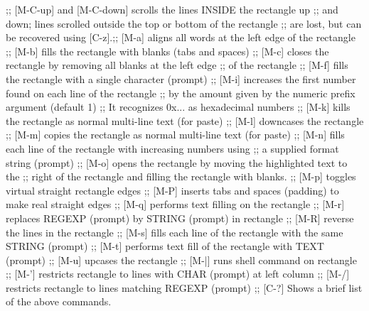 \documentclass[11pt]{article}
\begin{document}
{;; [M-C-up] and [M-C-down] scrolls the lines INSIDE the rectangle up
;; and down; lines scrolled outside the top or bottom of the rectangle
;; are lost, but can be recovered using [C-z].;; [M-a] aligns all words at the left edge of the rectangle
;; [M-b] fills the rectangle with blanks (tabs and spaces)
;; [M-c] closes the rectangle by removing all blanks at the left edge
;;       of the rectangle
;; [M-f] fills the rectangle with a single character (prompt)
;; [M-i] increases the first number found on each line of the rectangle
;;       by the amount given by the numeric prefix argument (default 1)
;;       It recognizes 0x... as hexadecimal numbers
;; [M-k] kills the rectangle as normal multi-line text (for paste)
;; [M-l] downcases the rectangle
;; [M-m] copies the rectangle as normal multi-line text (for paste)
;; [M-n] fills each line of the rectangle with increasing numbers using
;;       a supplied format string (prompt)
;; [M-o] opens the rectangle by moving the highlighted text to the
;;       right of the rectangle and filling the rectangle with blanks.
;; [M-p] toggles virtual straight rectangle edges
;; [M-P] inserts tabs and spaces (padding) to make real straight edges
;; [M-q] performs text filling on the rectangle
;; [M-r] replaces REGEXP (prompt) by STRING (prompt) in rectangle
;; [M-R] reverse the lines in the rectangle
;; [M-s] fills each line of the rectangle with the same STRING (prompt)
;; [M-t] performs text fill of the rectangle with TEXT (prompt)
;; [M-u] upcases the rectangle
;; [M-|] runs shell command on rectangle
;; [M-'] restricts rectangle to lines with CHAR (prompt) at left column
;; [M-/] restricts rectangle to lines matching REGEXP (prompt)
;; [C-?] Shows a brief list of the above commands.

}
\end{document}
